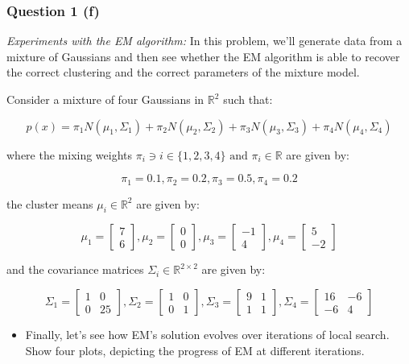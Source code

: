 \documentclass{article}
\begin{document}
\subsubsection*{Question 1 (f)}
\begin{flushleft}
\textit{Experiments with the EM algorithm:} In this problem, we'll generate data from a mixture of Gaussians and then see whether the EM algorithm is able to recover the correct clustering and the correct parameters of the mixture model.
\end{flushleft}
\begin{flushleft}
    Consider a mixture of four Gaussians in $\mathbb{R}^2$ such that:
\end{flushleft}
$$p(x) = \pi_1 N(\mu_1, \Sigma_1) + \pi_2 N(\mu_2, \Sigma_2) + \pi_3 N(\mu_3, \Sigma_3) + \pi_4 N(\mu_4, \Sigma_4)$$
\begin{flushleft}
    where the mixing weights $\pi_i \ni i \in \{1,2,3,4\} \text{ and } \pi_i \in \mathbb{R}$ are given by:
\end{flushleft}
$$\pi_1 = 0.1, \pi_2 = 0.2, \pi_3 = 0.5, \pi_4 = 0.2$$
\begin{flushleft}
    the cluster means $\mu_i \in \mathbb{R}^2$ are given by:
\end{flushleft}
$$\mu_1 = \begin{bmatrix}7 \\ 6\end{bmatrix}, \mu_2 = \begin{bmatrix}0 \\ 0\end{bmatrix}, \mu_3 = \begin{bmatrix}-1 \\ 4\end{bmatrix}, \mu_4 = \begin{bmatrix}5 \\ -2\end{bmatrix}$$
\begin{flushleft}
    and the covariance matrices $\Sigma_i \in \mathbb{R}^{2 \times 2}$ are given by:
\end{flushleft}
$$\Sigma_1 = \begin{bmatrix}1 & 0 \\ 0 & 25\end{bmatrix}, \Sigma_2 = \begin{bmatrix}1 & 0 \\ 0 & 1\end{bmatrix}, \Sigma_3 = \begin{bmatrix}9 & 1 \\ 1 & 1\end{bmatrix}, \Sigma_4 = \begin{bmatrix}16 & -6 \\ -6 & 4\end{bmatrix}$$
\begin{itemize}
    \item Finally, let's see how EM's solution evolves over iterations of local search. Show four plots, depicting the progress of EM at different iterations.
\end{itemize}
\end{document}
